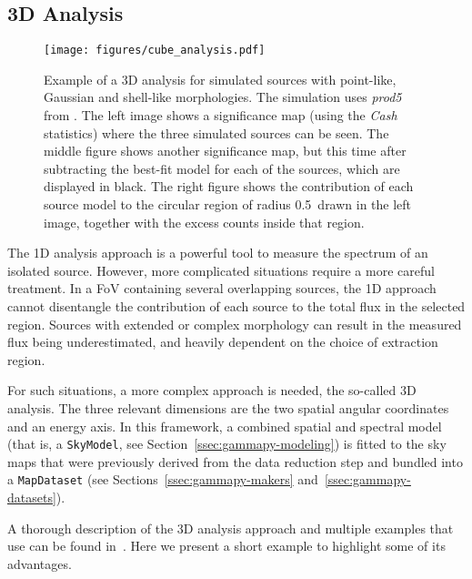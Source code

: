 \documentclass[longauth]{aa}
\newcommand{\code}[1]{\texttt{#1}}
\begin{document}
\subsection{3D Analysis}
\label{ssec:3d-analysis}
%
\begin{figure*}[t]
	\centering
	\texttt{[image: figures/cube\_analysis.pdf]}
	\caption{Example of a 3D analysis for simulated sources with point-like, Gaussian
		and shell-like morphologies. The simulation uses \textit{prod5} \irfs from \cta
		\citep{CtaProd5}.
		The left image shows a significance map (using the \emph{Cash} statistics)
		where the three simulated sources can be seen. The middle figure shows another significance map,
		but this time after
		subtracting the best-fit model for each of the sources, which are displayed in
		black. The right figure shows the contribution of each source model to the
		circular region of radius 0.5\textdegree~drawn in the left image, together with
		the excess counts inside that region. }
	\label{fig:cube_analysis}
\end{figure*}
%
The 1D analysis approach is a powerful tool to measure the spectrum of an
isolated source. However, more complicated situations require a more careful
treatment. In a FoV containing several overlapping sources, the 1D
approach cannot disentangle the contribution of each source to the total flux in
the selected region. Sources with extended or complex morphology can result in
the measured flux being underestimated, and heavily dependent on the choice of
extraction region.

For such situations, a more complex approach is needed, the so-called 3D
analysis. The three relevant dimensions are the two spatial angular coordinates
and an energy axis. In this framework, a combined spatial and spectral model
(that is, a \code{SkyModel}, see Section~\ref{ssec:gammapy-modeling}) is fitted to the
sky maps that were previously derived from the data reduction step and bundled into a
\code{MapDataset} (see Sections~\ref{ssec:gammapy-makers} and~\ref{ssec:gammapy-datasets}).

A thorough description of the 3D analysis approach and multiple examples that
use \gammapy can be found in~\cite{Mohrmann2019}. Here we present a short
example to highlight some of its advantages.
\end{document}
